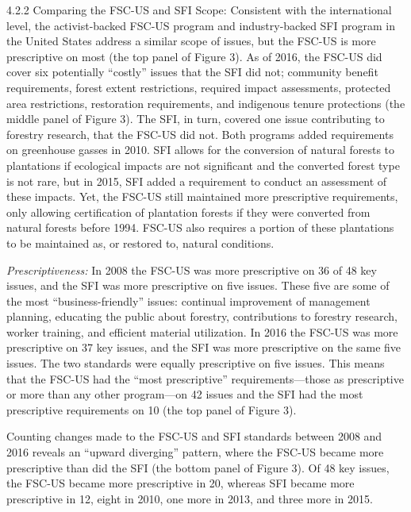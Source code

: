 \documentclass[
      12pt,
            Review ]{article}
\begin{document}
4.2.2 Comparing the FSC-US and SFI Scope: Consistent with the
international level, the activist-backed FSC-US program and
industry-backed SFI program in the United States address a similar scope
of issues, but the FSC-US is more prescriptive on most (the top panel of
Figure 3). As of 2016, the FSC-US did cover six potentially ``costly''
issues that the SFI did not; community benefit requirements, forest
extent restrictions, required impact assessments, protected area
restrictions, restoration requirements, and indigenous tenure
protections (the middle panel of Figure 3). The SFI, in turn, covered
one issue contributing to forestry research, that the FSC-US did not.
Both programs added requirements on greenhouse gasses in 2010. SFI
allows for the conversion of natural forests to plantations if
ecological impacts are not significant and the converted forest type is
not rare, but in 2015, SFI added a requirement to conduct an assessment
of these impacts. Yet, the FSC-US still maintained more prescriptive
requirements, only allowing certification of plantation forests if they
were converted from natural forests before 1994. FSC-US also requires a
portion of these plantations to be maintained as, or restored to,
natural conditions.

\emph{Prescriptiveness:} In 2008 the FSC-US was more prescriptive on 36
of 48 key issues, and the SFI was more prescriptive on five issues.
These five are some of the most ``business-friendly'' issues: continual
improvement of management planning, educating the public about forestry,
contributions to forestry research, worker training, and efficient
material utilization. In 2016 the FSC-US was more prescriptive on 37 key
issues, and the SFI was more prescriptive on the same five issues. The
two standards were equally prescriptive on five issues. This means that
the FSC-US had the ``most prescriptive'' requirements---those as
prescriptive or more than any other program---on 42 issues and the SFI
had the most prescriptive requirements on 10 (the top panel of Figure
3).

Counting changes made to the FSC-US and SFI standards between 2008 and
2016 reveals an ``upward diverging'' pattern, where the FSC-US became
more prescriptive than did the SFI (the bottom panel of Figure 3). Of 48
key issues, the FSC-US became more prescriptive in 20, whereas SFI
became more prescriptive in 12, eight in 2010, one more in 2013, and
three more in 2015.
\end{document}
